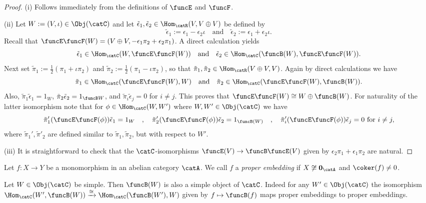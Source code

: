\documentclass[12pt]{amsart}
\begin{document}
\begin{proof}
(i) Follows immediately from the definitions of $\funcE$ and $\funcF$. 

(ii) Let $W:=(V,\iota)\in \Obj(\catC)$ and let $\tilde\epsilon_1,\tilde\epsilon_2\in
\Hom_{\catR}(V,V\oplus V)$ be defined by 
\[
\tilde\epsilon_1:=\epsilon_1-\epsilon_2\iota\quad\text{and}\quad
\tilde\epsilon_2:=\epsilon_1+\epsilon_2\iota.
\]
Recall that 
$\funcE\funcF (W)=(V\oplus V,-\epsilon_{1}\pi_{2}+\epsilon_{2}\pi_{1})$. A direct calculation yields
\[
\tilde\epsilon_1\in \Hom_{\catC}(W,\funcE\funcF (W))\quad\text{and}\quad
\tilde\epsilon_2\in \Hom_{\catC}(\funcB (W),\funcE\funcF (W)).
\]
Next set $\tilde\pi_1:=\frac12(\pi_1+\iota\pi_2)$ and $\tilde\pi_2:=\frac12(\pi_1-\iota\pi_2)$, so that $\tilde\pi_1,\tilde\pi_2\in\Hom_{\catR}(V\oplus V,V)$. Again by direct calculations we have 
\[
\tilde\pi_1\in\Hom_\catC(\funcE\funcF (W),W)\quad\text{and}
\quad
\tilde\pi_2\in\Hom_\catC(\funcE\funcF (W),\funcB (W)).
\]
Also, $\tilde \pi_1\tilde\epsilon_1=1_W$, 
$\tilde \pi_2\tilde\epsilon_2=1_{\funcB W}$, and 
$\tilde \pi_i\tilde\epsilon_j=0$ for $i\neq j$. This proves that $\funcE\funcF (W)\cong W\oplus \funcB (W)$.  
For naturality of the latter  isomorphism note that 
for 
$\phi\in\Hom_{\catC}(W,W')$
where  $W,W'\in\Obj(\catC)$ 
we have 
\[
\tilde \pi'_1(\funcE\funcF(\phi))\tilde\epsilon_1=1_W\quad,\quad
\tilde \pi'_2(\funcE\funcF(\phi))\tilde\epsilon_2=1_{\funcB(W)}\quad,\quad
\tilde \pi'_i(\funcE\funcF(\phi))\tilde\epsilon_j=0
\text{ for }i\neq j, 
\]
where $\tilde\pi_1',\tilde\pi'_2$ are defined similar to $\tilde\pi_1,\tilde\pi_2$, but with respect to $W'$. 

(iii) It is straightforward to check that the $\catC$-isomorphisms $\funcE(V)\to\funcB\funcE(V)$ given by 
$\epsilon_2\pi_1+\epsilon_1\pi_2$ are natural.
\end{proof}

\begin{dfn}
Let $f:X\to Y$ be a monomorphism in an abelian category $\catA$. We call $f$  a \emph{proper embedding} if $X\not\cong \mathbf 0_\catA$ and $\coker(f)\neq 0$. 
\end{dfn}


\begin{rmk}
\label{rmk:WsimpleBWsimple}
Let $W\in\Obj(\catC)$ be simple. Then $\funcB(W)$ is also a simple object of $\catC$. Indeed   for any $W'\in\Obj(\catC)$ the isomorphism $\Hom_\catC(W',\funcB(W))\xrightarrow{\cong}
\Hom_\catC(\funcB(W'),W)$ given by $f\mapsto \funcB(f)$ maps proper embeddings to proper embeddings.

\end{rmk}
\end{document}
